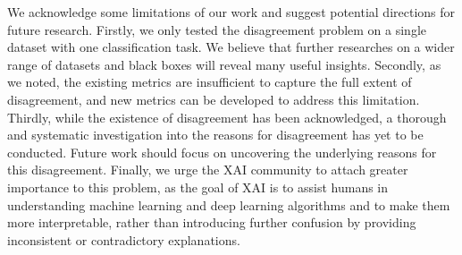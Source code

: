 We acknowledge some limitations of our work and suggest potential directions for future research. Firstly, we only tested the disagreement problem on a single dataset with one classification task. We believe that further researches on a wider range of datasets and black boxes will reveal many useful insights. Secondly, as we noted, the existing metrics are insufficient to capture the full extent of disagreement, and new metrics can be developed to address this limitation. Thirdly, while the existence of disagreement has been acknowledged, a thorough and systematic investigation into the reasons for disagreement has yet to be conducted. Future work should focus on uncovering the underlying reasons for this disagreement. Finally, we urge the XAI community to attach greater importance to this problem, as the goal of XAI is to assist humans in understanding machine learning and deep learning algorithms and to make them more interpretable, rather than introducing further confusion by providing inconsistent or contradictory explanations.
